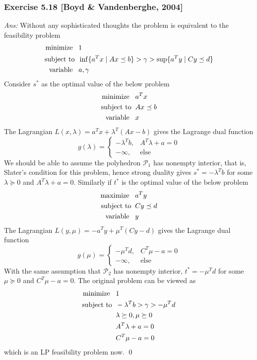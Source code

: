 \documentclass[12pt,a4paper]{article}
\newcommand{\casebrak}[4]{\left \{ \begin{array}{ll} {#1},&{#2}\\{#3},&{#4} \end{array} \right.}
\begin{document}
\subsubsection*{Exercise 5.18 [Boyd \& Vandenberghe, 2004]}
{\it Ans:}  Without any sophisticated thoughts the problem is equivalent to the feasibility problem
\begin{align*}
\mbox{minimize\;\;\;}& 1\\
\mbox{subject to\;\;}& \inf \{a^Tx \mid Ax\preceq b\} > \gamma > \sup\{a^Ty \mid Cy \preceq d\} \\
\mbox{variable\;\;\;}& a, \gamma
\end{align*}
Consider $s^\ast$ as the optimal value of the below problem
\begin{align*}
\mbox{minimize\;\;\;}& a^Tx\\
\mbox{subject to\;\;}& Ax\preceq b\\
\mbox{variable\;\;\;}& x
\end{align*}
The Lagrangian $L(x, \lambda) = a^Tx + \lambda^T(Ax-b)$ gives the Lagrange dual function
$$g(\lambda) = \casebrak{-\lambda^Tb}{A^T\lambda + a = 0}{-\infty}{\mbox{else}}$$
We should be able to assume the polyhedron $\mathcal P_1$ has nonempty interior, that is, Slater's condition for this problem, hence strong duality gives $s^\ast = -\lambda^Tb$ for some $\lambda \succeq 0$ and $A^T\lambda + a = 0$. Similarly if $t^\ast$ is the optimal value of the below problem
\begin{align*}
\mbox{maximize\;\;\;}& a^Ty\\
\mbox{subject to\;\;}& Cy\preceq d\\
\mbox{variable\;\;\;}& y
\end{align*}
The Lagrangian $L(y, \mu) = -a^Ty + \mu^T(Cy-d)$ gives the Lagrange dual function
$$g(\mu) = \casebrak{-\mu^Td}{C^T\mu - a = 0}{-\infty}{\mbox{else}}$$
With the same assumption that $\mathcal P_2$ has nonempty interior, $t^\ast = -\mu^Td$ for some $\mu \succeq 0$ and $C^T\mu-a = 0$. The original problem can be viewed as
\begin{align*}
\mbox{minimize\;\;\;} &1\\
\mbox{subject to\;\;} & -\lambda^Tb > \gamma > -\mu^Td\\
& \lambda \succeq 0, \mu \succeq 0\\
& A^T\lambda + a = 0\\
& C^T\mu - a = 0
\end{align*}
which is an LP feasibility problem now. \qed
\end{document}
